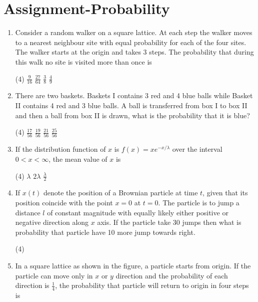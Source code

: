 \chapter{Assignment-Probability}
\begin{enumerate}
	\item Consider a random walker on a square lattice. At each step the walker moves to a nearest neighbour site with equal probability for each of the four sites. The walker starts at the origin and takes 3 steps. The probability that during this walk no site is visited more than once is
	 \begin{tasks}(4)
		\task[\textbf{a.}]$\frac{9}{16}$
		\task[\textbf{b.}]$\frac{27}{64}$
		\task[\textbf{c.}]$\frac{3}{8}$
		\task[\textbf{d.}]$\frac{4}{9}$
	\end{tasks}
	\item There are two baskets. Baskets I contains 3 red and 4 blue balls while Basket II contains 4 red and 3 blue balls. A ball is transferred from box I to box II and then a ball from box II is drawn, what is the probability that it is blue?
	 \begin{tasks}(4)
		\task[\textbf{a.}]$\frac{17}{56}$
		\task[\textbf{b.}]$\frac{19}{56}$
		\task[\textbf{c.}]$\frac{21}{56}$
		\task[\textbf{d.}] $\frac{25}{56}$
	\end{tasks}
	\item If the distribution function of $x$ is $f(x)=x e^{-x / \lambda}$ over the interval $0<x<\infty$, the mean value of $x$ is
	 \begin{tasks}(4)
		\task[\textbf{a.}]$\lambda$
		\task[\textbf{b.}]$2 \lambda$
		\task[\textbf{c.}] $\frac{\lambda}{2}$
	\end{tasks}
	\item If $x(t)$ denote the position of a Brownian particle at time $t$, given that its position coincide with the point $x=0$ at $t=0$. The particle is to jump a distance $l$ of constant magnitude with equally likely either positive or negative direction along $x$ axis. If the particle take 30 jumps then what is probability that particle have 10 more jump towards right.
	 \begin{tasks}(4)
		\task[\textbf{a.}]\color{red}{?}
		\task[\textbf{b.}]\color{red}{?}
		\task[\textbf{c.}]\color{red}{?}
		\task[\textbf{d.}]\color{red}{?}
	\end{tasks}
	\item In a square lattice as shown in the figure, a particle starts from origin. If the particle can move only in $x$ or $y$ direction and the probability of each direction is $\frac{1}{4}$, the probability that particle will return to origin in four steps is

\end{enumerate}
